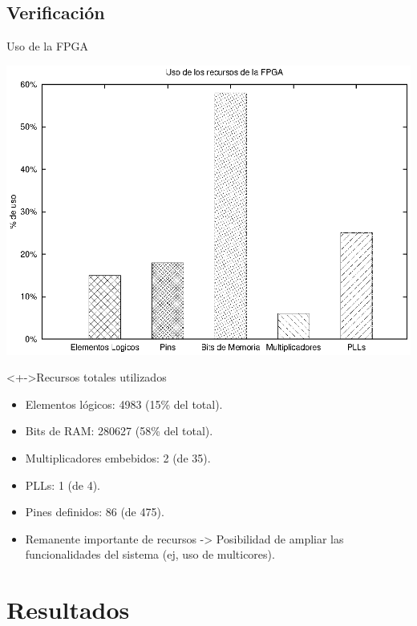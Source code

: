 \documentclass[xcolor=dvipsnames]{beamer}
\begin{document}
\subsection{Verificación}
\begin{frame}{Uso de la FPGA}

	\center	
	\includegraphics[scale=0.30]{figures/fpga.eps}  
	

   \begin{block}<+->{Recursos totales utilizados}	
    \begin{itemize}
	\scriptsize
     	\item Elementos lógicos: 4983 (15\% del total).
	\item Bits de RAM: 280627 (58\% del total).
	\item Multiplicadores embebidos: 2 (de 35).
	\item PLLs: 1 (de 4).
	\item Pines definidos: 86 (de 475).
	\item Remanente importante de recursos -> Posibilidad de ampliar las funcionalidades del sistema (ej, uso de multicores).
    \end{itemize}	
  \end{block}


\end{frame}


\section{Resultados}
\end{document}
